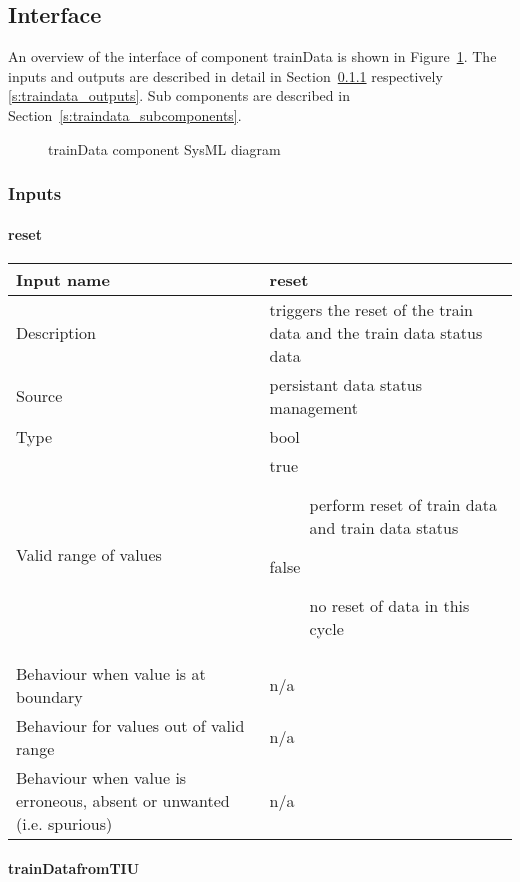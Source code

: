 \subsection{Interface}

An overview of the interface of component trainData is shown in Figure~\ref{f:traindata_interface}. The inputs and outputs are described in detail in Section~\ref{s:traindata_inputs} respectively \ref{s:traindata_outputs}. Sub components are described in Section~\ref{s:traindata_subcomponents}.

\begin{figure}
\center
{}
\caption{trainData component SysML diagram}\label{f:traindata_interface}
\end{figure}


\subsubsection{Inputs}\label{s:traindata_inputs}

\paragraph{reset}

\begin{longtable}{p{}p{}}
\toprule
Input name				& reset \\
\midrule
Description				& triggers the reset of the train data and the train data status data\\
\midrule
Source					& persistant data status management\\ 
\midrule
Type					& bool \\
\midrule
Valid range of values	& 
\begin{description}
\item[true] perform reset of train data and train data status
\item[false] no reset of data in this cycle
\end{description}
\\
\midrule
Behaviour when value is at boundary	& n/a \\
\midrule
Behaviour for values out of valid range	& n/a \\
\midrule
Behaviour when value is erroneous, absent or unwanted (i.e. spurious) & n/a \\
\bottomrule
\end{longtable}

\paragraph{trainDatafromTIU}

